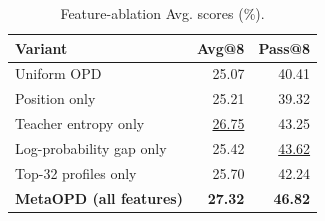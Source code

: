 \documentclass{article}
\theoremstyle{plain}
\theoremstyle{definition}
\theoremstyle{remark}
\begin{document}


\begin{table}
\vspace{\dimexpr-\intextsep-1.4pt\relax}
\centering
\footnotesize
{}
\setlength{\tabcolsep}{4pt}
\renewcommand{\arraystretch}{0.92}
\captionsetup{position=top,font=normalsize}
\caption{Feature-ablation Avg. scores (\%).}
\label{tab:metaopd-feature-summary}
\begin{tabularx}{\linewidth}{Xrr}
\toprule
Variant & Avg@8 & Pass@8 \\
\midrule
\textcolor{MetaAblationBaseText}{Uniform OPD} & 25.07 & 40.41 \\
Position only & 25.21 & 39.32 \\
Teacher entropy only & \underline{26.75} & 43.25 \\
Log-probability gap only & 25.42 & \underline{43.62} \\
Top-32 profiles only & 25.70 & 42.24 \\
\rowcolor{MetaAblationFullBg}
\textcolor{MetaAblationFullText}{\textbf{MetaOPD (all features)}} & \textbf{27.32} & \textbf{46.82} \\
\bottomrule
\end{tabularx}
\end{table}
\end{document}
